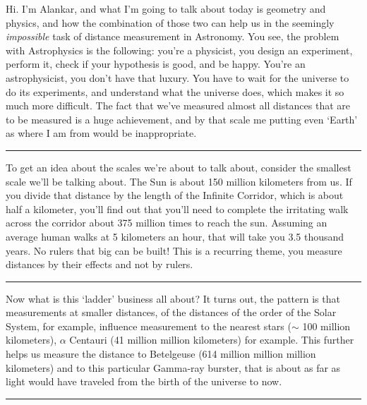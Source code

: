 \documentclass[11pt]{article}
\begin{document}
\noindent Hi. I'm Alankar, and what I'm going to talk about today is geometry and physics, and how the combination of those two can help us in the seemingly \textit{impossible} task of distance measurement in Astronomy. You see, the problem with Astrophysics is the following: you're a physicist, you design an experiment, perform it, check if your hypothesis is good, and be happy. You're an astrophysicist, you don't have that luxury. You have to wait for the universe to do its experiments, and understand what the universe does, which makes it so much more difficult. The fact that we've measured almost all distances that are to be measured is a huge achievement, and by that scale me putting even `Earth' as where I am from would be inappropriate.

\noindent\rule[0.5ex]{\linewidth}{1pt}

\noindent To get an idea about the scales we're about to talk about, consider the smallest scale we'll be talking about. The Sun is about 150 million kilometers from us. If you divide that distance by the length of the Infinite Corridor, which is about half a kilometer, you'll find out that you'll need to complete the irritating walk across the corridor about 375 million times to reach the sun. Assuming an average human walks at 5 kilometers an hour, that will take you 3.5 thousand years. No rulers that big can be built! This is a recurring theme, you measure distances by their effects and not by rulers.

\noindent\rule[0.5ex]{\linewidth}{1pt}

\noindent Now what is this `ladder' business all about? It turns out, the pattern is that measurements at smaller distances, of the distances of the order of the Solar System, for example, influence measurement to the nearest stars ($\sim$ 100 million kilometers), $\alpha$ Centauri (41 million million kilometers) for example. This further helps us measure the distance to Betelgeuse (614 million million million kilometers) and to this particular Gamma-ray burster, that is about as far as light would have traveled from the birth of the universe to now.

\noindent\rule[0.5ex]{\linewidth}{1pt}
\end{document}
